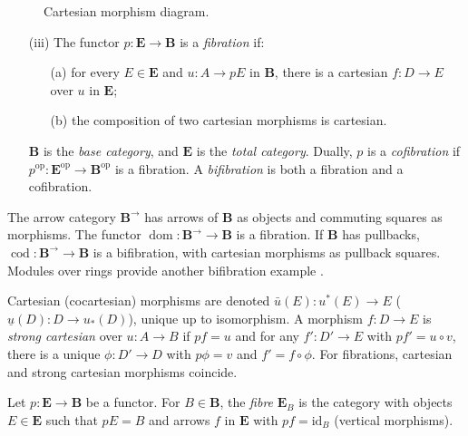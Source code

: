 \documentclass{article}
\begin{document}
\begin{definition}
\begin{figure}[h]
    \caption{Cartesian morphism diagram.}
    \label{fig:cartesian-cocartesian}
\end{figure}
\begin{enumerate}
    \item[(iii)] The functor $p : \mathbf{E} \to \mathbf{B}$ is a \emph{fibration} if:
        \begin{itemize}
            \item[(a)] for every $E \in \mathbf{E}$ and $u : A \to p E$ in $\mathbf{B}$, there is a cartesian $f : D \to E$ over $u$ in $\mathbf{E}$;
            \item[(b)] the composition of two cartesian morphisms is cartesian.
        \end{itemize}
        $\mathbf{B}$ is the \emph{base category}, and $\mathbf{E}$ is the \emph{total category}. Dually, $p$ is a \emph{cofibration} if $p^{\text{op}} : \mathbf{E}^{\text{op}} \to \mathbf{B}^{\text{op}}$ is a fibration. A \emph{bifibration} is both a fibration and a cofibration.
\end{enumerate}
\end{definition}

The arrow category $\mathbf{B}^{\to}$ has arrows of $\mathbf{B}$ as objects and commuting squares as morphisms. The functor $\operatorname{dom} : \mathbf{B}^{\to} \to \mathbf{B}$ is a fibration. If $\mathbf{B}$ has pullbacks, $\operatorname{cod} : \mathbf{B}^{\to} \to \mathbf{B}$ is a bifibration, with cartesian morphisms as pullback squares. Modules over rings provide another bifibration example \cite{Gray1966}.

Cartesian (cocartesian) morphisms are denoted $\bar{u}(E) : u^*(E) \to E$ ($\underline{u}(D) : D \to u_*(D)$), unique up to isomorphism. A morphism $f : D \to E$ is \emph{strong cartesian} over $u : A \to B$ if $p f = u$ and for any $f' : D' \to E$ with $p f' = u \circ v$, there is a unique $\phi : D' \to D$ with $p \phi = v$ and $f' = f \circ \phi$. For fibrations, cartesian and strong cartesian morphisms coincide.

\begin{definition}
\label{def:2.2}
Let $p : \mathbf{E} \to \mathbf{B}$ be a functor. For $B \in \mathbf{B}$, the \emph{fibre} $\mathbf{E}_B$ is the category with objects $E \in \mathbf{E}$ such that $p E = B$ and arrows $f$ in $\mathbf{E}$ with $p f = \text{id}_B$ (vertical morphisms).
\end{definition}
\end{document}
